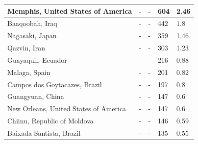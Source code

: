 \documentclass[sageh,times]{sagej}
\begin{document}
\begin{table}[!htbp]
\begin{tabular}{| l | l |l| l | l|}
Memphis, United States of America &-&- & 604 & 2.46\\ \hline
Baaqoobah, Iraq &-&- & 442 & 1.8\\ \hline
Nagasaki, Japan &-&- & 359 & 1.46\\ \hline
Qazvin, Iran &-&- & 303 & 1.23\\ \hline
Guayaquil, Ecuador &-&- & 216 & 0.88\\ \hline
Malaga, Spain &-&- & 201 & 0.82\\ \hline
Campos dos Goytacazes, Brazil &-&- & 197 & 0.8\\ \hline
Guangyuan, China &-&- & 147 & 0.6\\ \hline
New Orleans, United States of America &-&- & 147 & 0.6\\ \hline
Chiinu, Republic of Moldova &-&- & 146 & 0.59\\ \hline
Baixada Santista, Brazil &-&- & 135 & 0.55\\ \hline
\end{tabular}
\end{table}
\end{document}
